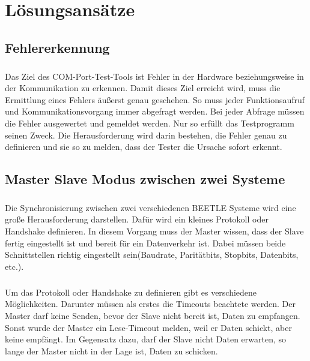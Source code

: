 \chapter{Lösungsansätze}\label{chp:loesungsansaetze}

\section{Fehlererkennung}
\paragraph{}
Das Ziel des COM-Port-Test-Tools ist Fehler in der Hardware beziehungsweise in der Kommunikation zu erkennen. Damit dieses Ziel erreicht wird, muss die Ermittlung eines Fehlers äußerst genau geschehen. So muss jeder Funktionsaufruf und Kommunikationsvorgang immer abgefragt werden. Bei jeder Abfrage müssen die Fehler ausgewertet und gemeldet werden. Nur so erfüllt das Testprogramm seinen Zweck. Die Herausforderung wird darin bestehen, die Fehler genau zu definieren und sie so zu melden, dass der Tester die Ursache sofort erkennt.

\section{Master Slave Modus zwischen zwei Systeme}
\paragraph{}
Die Synchronisierung zwischen zwei verschiedenen BEETLE Systeme wird eine große Herausforderung darstellen. Dafür wird ein kleines Protokoll oder Handshake definieren. In diesem Vorgang muss der Master wissen, dass der Slave fertig eingestellt ist und bereit für ein Datenverkehr ist. Dabei müssen beide Schnittstellen richtig eingestellt sein(Baudrate, Paritätbits, Stopbits, Datenbits, etc.).

\paragraph{}
Um das Protokoll oder Handshake zu definieren gibt es verschiedene Möglichkeiten. Darunter müssen als erstes die Timeouts beachtete werden. Der Master darf keine Senden, bevor der Slave nicht bereit ist, Daten zu empfangen. Sonst wurde der Master ein Lese-Timeout melden, weil er Daten schickt, aber keine empfängt. Im Gegensatz dazu, darf der Slave nicht Daten erwarten, so lange der Master nicht in der Lage ist, Daten zu schicken.

